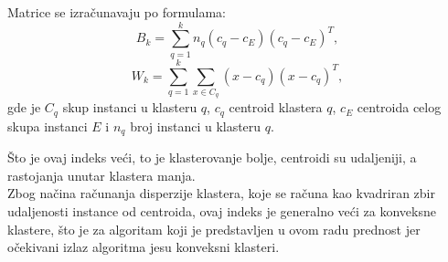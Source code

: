 \documentclass[a4paper,serbian]{symopissr}
\begin{document}
Matrice se izračunavaju po formulama:
%
\begin{equation}
	B_k = \sum_{q=1}^{k} n_q(c_q - c_E)(c_q - c_E)^T,
\end{equation}
%
\begin{equation} 
	W_k = \sum_{q=1}^{k}\sum_{x \in C_q}(x - c_q)(x - c_q)^T,
\end{equation}
%
gde je $C_q$ skup instanci u klasteru $q$, $c_q$ centroid klastera $q$, $c_E$  centroida celog skupa instanci $E$ i $n_q$ broj instanci u klasteru $q$.

Što je ovaj indeks veći, to je klasterovanje bolje, centroidi su udaljeniji, a rastojanja unutar klastera manja.\\
Zbog načina računanja disperzije klastera, koje se računa kao kvadriran zbir udaljenosti instance od centroida, ovaj indeks je generalno veći za konveksne klastere, što je za algoritam koji je predstavljen u ovom radu prednost jer očekivani izlaz algoritma jesu konveksni klasteri.
\\
\end{document}
